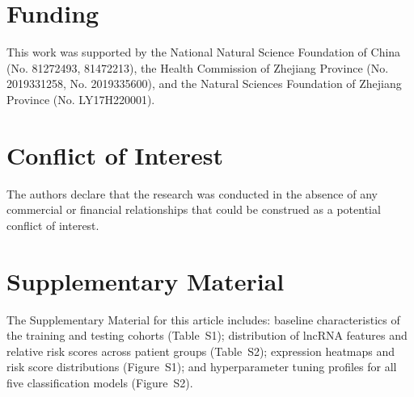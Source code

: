 \documentclass[12pt,a4paper]{article}
\begin{document}
\section{Funding}

This work was supported by the National Natural Science Foundation of China (No. 81272493, 81472213), the Health Commission of Zhejiang Province (No. 2019331258, No. 2019335600), and the Natural Sciences Foundation of Zhejiang Province (No. LY17H220001).

\section{Conflict of Interest}

The authors declare that the research was conducted in the absence of any commercial or financial relationships that could be construed as a potential conflict of interest.

\section{Supplementary Material}

The Supplementary Material for this article includes: baseline characteristics of the training and testing cohorts (Table~S1); distribution of lncRNA features and relative risk scores across patient groups (Table~S2); expression heatmaps and risk score distributions (Figure~S1); and hyperparameter tuning profiles for all five classification models (Figure~S2).
\end{document}
